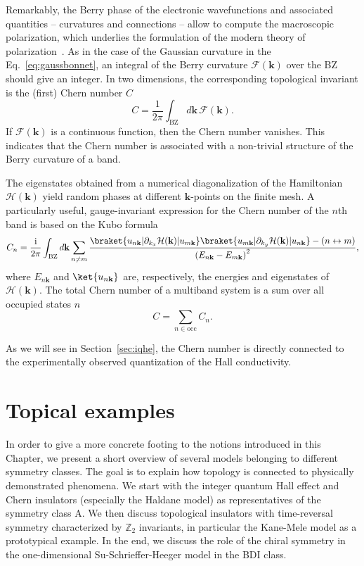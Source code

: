 Remarkably, the Berry phase of the electronic wavefunctions and associated quantities -- curvatures and connections -- allow to compute the macroscopic polarization, which underlies the formulation of the modern theory of polarization~\cite{resta2007theory}. As in the case of the Gaussian curvature in the Eq.~\eqref{eq:gaussbonnet}, an integral of the Berry curvature $\bm{\mathcal{F}} ( \mathbf{k})$ over the BZ should give an integer. In two dimensions, the corresponding topological invariant is the (first) Chern number $C$
\begin{equation}
C = \frac{1}{2 \pi}  \int_{\mathrm{BZ}} d\mathbf{k} \, \bm{\mathcal{F}}  (\mathbf{k}).
\label{eq:chern_number}
\end{equation}
If $\bm{\mathcal{F}} (\mathbf{k})$ is a continuous function, then the Chern number vanishes. This indicates that the Chern number is associated with a non-trivial structure of the Berry curvature of a band. 

The eigenstates obtained from a numerical diagonalization of the Hamiltonian $\mathcal{H} (\mathbf{k})$ yield random phases at different $\mathbf{k}$-points on the finite mesh. A particularly useful, gauge-invariant expression for the Chern number of the $n$th band is based on the Kubo formula
\begin{equation}
C_n = \frac{\mathrm{i}}{2 \pi} \int_{\mathrm{BZ}} d \mathbf{k} \sum_{n \neq m}  \frac{ \braket{ u_{n \mathbf{k}} | \partial_{k_x} \mathcal{H} (\mathbf{k}) | u_{m \mathbf{k}}} \braket{ u_{m \mathbf{k}} | \partial_{k_y} \mathcal{H} (\mathbf{k}) | u_{n \mathbf{k}} } - (n \leftrightarrow m)  }{ \left( E_{n \mathbf{k}} - E_{m \mathbf{k}} \right)^2},
\label{eq:chern-kubo}
\end{equation}
where $E_{n \mathbf{k}}$ and $\ket{u_{n \mathbf{k}}}$ are, respectively, the energies and eigenstates of $\mathcal{H} (\mathbf{k})$. The total Chern number of a multiband system is a sum over all occupied states $n$
\begin{equation}
C = \sum_{n \in \mathrm{occ}} C_n.
\end{equation}

As we will see in Section~\ref{sec:iqhe}, the Chern number is directly connected to the experimentally observed quantization of the Hall conductivity.

\section{Topical examples}
\label{sec:examples}
In order to give a more concrete footing to the notions introduced in this Chapter, we present a short overview of several models belonging to different symmetry classes. The goal is to explain how topology is connected to physically demonstrated phenomena. We start with the integer quantum Hall effect and Chern insulators (especially the Haldane model) as representatives of the symmetry class A. We then discuss topological insulators with time-reversal symmetry characterized by $\mathbb{Z}_2$ invariants, in particular the Kane-Mele model as a prototypical example. In the end, we discuss the role of the chiral symmetry in the one-dimensional Su-Schrieffer-Heeger model in the BDI class.

